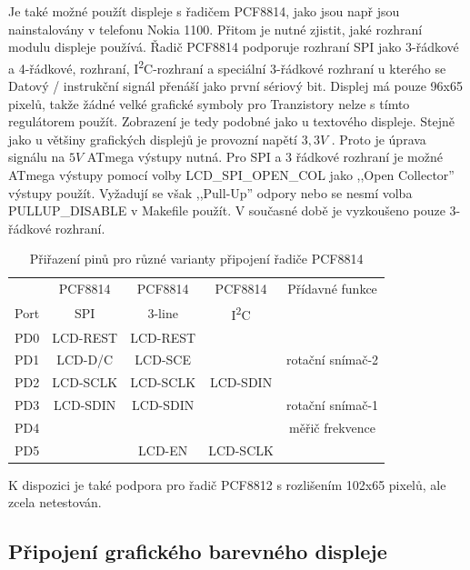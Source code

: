 Je také možné použít displeje s řadičem PCF8814, jako jsou např
jsou nainstalovány v telefonu Nokia 1100. Přitom je nutné zjistit, jaké rozhraní modulu displeje
používá. Řadič PCF8814 podporuje rozhraní SPI jako 3-řádkové a 4-řádkové,
rozhraní, I\textsuperscript{2}C-rozhraní a speciální 3-řádkové rozhraní u kterého se
Datový / instrukční signál přenáší jako první sériový bit.
Displej má pouze 96x65 pixelů, takže žádné velké grafické symboly pro
Tranzistory nelze s tímto regulátorem použít. Zobrazení je tedy podobné jako u textového displeje.
Stejně jako u většiny grafických displejů je provozní napětí \(3,3V\) .
Proto je úprava signálu na \(5V\) ATmega výstupy nutná.
Pro SPI a 3 řádkové rozhraní je možné ATmega výstupy pomocí volby LCD\_SPI\_OPEN\_COL jako
 ,,Open Collector'' výstupy použít.
Vyžadují se však ,,Pull-Up'' odpory nebo se nesmí volba PULLUP\_DISABLE v Makefile použít.
V současné době je vyzkoušeno pouze 3-řádkové rozhraní.
\begin{table}[H]
  \begin{center}
    \begin{tabular}{| c || c | c | c | c |}
    \hline
           &  PCF8814    & PCF8814        & PCF8814     & Přídavné funkce \\
      Port &    SPI      & 3-line         &   I\textsuperscript{2}C      & \\
    \hline
    \hline
    PD0    &   LCD-REST  & LCD-REST       &            & \\
    \hline
    PD1    &   LCD-D/C   & LCD-SCE        &             & rotační snímač-2 \\
    \hline
    PD2    &   LCD-SCLK  & LCD-SCLK       &  LCD-SDIN   & \\
    \hline
    PD3    &   LCD-SDIN  & LCD-SDIN       &             & rotační snímač-1 \\
    \hline
    PD4    &             &                &             & měřič frekvence \\
    \hline
    PD5    &             & LCD-EN         &   LCD-SCLK  & \\
    \hline
    \end{tabular}
  \end{center}
  \caption{Přiřazení pinů pro různé varianty připojení řadiče PCF8814}
  \label{tab:PCF8814-con}
\end{table}

K dispozici je také podpora pro řadič PCF8812 s rozlišením 102x65 pixelů,
ale zcela netestován.

\subsection{Připojení grafického barevného displeje}

